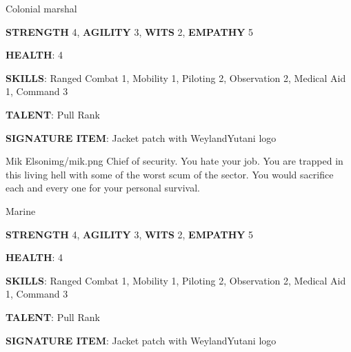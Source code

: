 \begin{rpg-commentbox}{}
    Colonial marshal

    \textbf{STRENGTH} 4, \textbf{AGILITY} 3, \textbf{WITS} 2, \textbf{EMPATHY} 5

    \textbf{HEALTH}: 4

    \textbf{SKILLS}: Ranged Combat 1, Mobility 1, Piloting 2, Observation 2, Medical Aid 1, Command 3
    
    \textbf{TALENT}: Pull Rank
    
    \textbf{SIGNATURE ITEM}: Jacket patch with WeylandYutani logo    
\end{rpg-commentbox}


\newsect

\begin{rpg-pcbox}{Mik Elson}{img/mik.png}
    Chief of security. You hate your job. You are trapped in this living hell with some of the worst scum of the sector. You would sacrifice each and every one for your personal survival.
\end{rpg-pcbox}

\begin{rpg-commentbox}{}
    Marine

    \textbf{STRENGTH} 4, \textbf{AGILITY} 3, \textbf{WITS} 2, \textbf{EMPATHY} 5

    \textbf{HEALTH}: 4

    \textbf{SKILLS}: Ranged Combat 1, Mobility 1, Piloting 2, Observation 2, Medical Aid 1, Command 3
    
    \textbf{TALENT}: Pull Rank
    
    \textbf{SIGNATURE ITEM}: Jacket patch with WeylandYutani logo    
\end{rpg-commentbox}

\newsect
